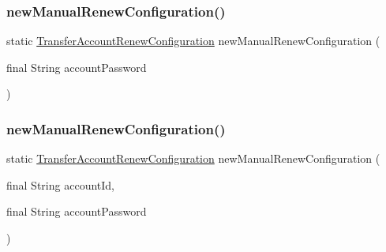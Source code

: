 \subsubsection{\texorpdfstring{new\+Manual\+Renew\+Configuration()}{newManualRenewConfiguration()}\hspace{0.1cm}{\footnotesize\ttfamily [1/2]}}
{\footnotesize\ttfamily static \hyperlink{classcom_1_1toast_1_1android_1_1gamebase_1_1auth_1_1transfer_1_1data_1_1_transfer_account_renew_configuration}{Transfer\+Account\+Renew\+Configuration} new\+Manual\+Renew\+Configuration (\begin{DoxyParamCaption}\item[{final String}]{account\+Password }\end{DoxyParamCaption})\hspace{0.3cm}{\ttfamily [static]}}

\mbox{\label{classcom_1_1toast_1_1android_1_1gamebase_1_1auth_1_1transfer_1_1data_1_1_transfer_account_renew_configuration_a0ecf179bdc49a22aebe2a18452550459}} 
\subsubsection{\texorpdfstring{new\+Manual\+Renew\+Configuration()}{newManualRenewConfiguration()}\hspace{0.1cm}{\footnotesize\ttfamily [2/2]}}
{\footnotesize\ttfamily static \hyperlink{classcom_1_1toast_1_1android_1_1gamebase_1_1auth_1_1transfer_1_1data_1_1_transfer_account_renew_configuration}{Transfer\+Account\+Renew\+Configuration} new\+Manual\+Renew\+Configuration (\begin{DoxyParamCaption}\item[{final String}]{account\+Id,  }\item[{final String}]{account\+Password }\end{DoxyParamCaption})\hspace{0.3cm}{\ttfamily [static]}}

